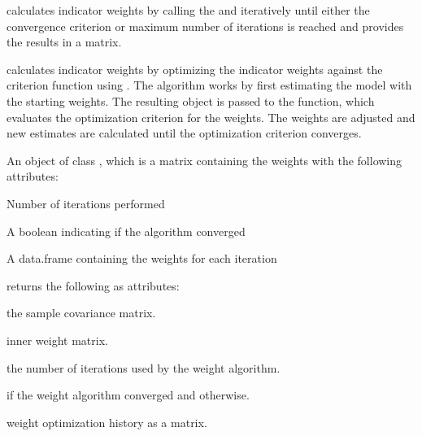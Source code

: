 \documentclass[a4paper]{book}
\begin{document}
\begin{Details}
 calculates indicator weights by calling the 
 and  iteratively until either the convergence criterion or
maximum number of iterations is reached and provides the results in a matrix.

 calculates indicator weights by optimizing the indicator
weights against the criterion function using . The
algorithm works by first estimating the model with the starting weights. The
resulting  object is passed to the 
function, which evaluates the optimization criterion for the weights. The
weights are adjusted and new estimates are calculated until the optimization
criterion converges.
\end{Details}
%
\begin{Value}
An object of class , which is a matrix containing the weights with the following attributes:

\begin{ldescription}
\item[\code{iterations}] Number of iterations performed

\item[\code{converged}] A boolean indicating if the algorithm converged

\item[\code{history}] A data.frame containing the weights for each iteration

\end{ldescription}
 returns the following as attributes:

\begin{ldescription}
\item[\code{S}] the sample covariance matrix.
\item[\code{E}] inner weight matrix.
\item[\code{iterations}] the number of iterations used by the weight algorithm.
\item[\code{converged}]  if the weight algorithm converged and  otherwise.
\item[\code{history}] weight optimization history as a matrix.
\end{ldescription}
\end{Value}
%
\end{document}
